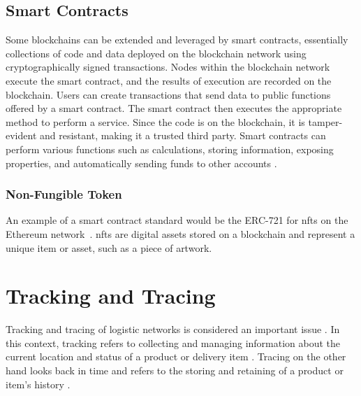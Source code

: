 \subsection{Smart Contracts}
Some blockchains can be extended and leveraged by smart contracts, essentially collections of code and data deployed on the blockchain network using cryptographically signed transactions. Nodes within the blockchain network execute the smart contract, and the results of execution are recorded on the blockchain. Users can create transactions that send data to public functions offered by a smart contract. The smart contract then executes the appropriate method to perform a service. Since the code is on the blockchain, it is tamper-evident and resistant, making it a trusted third party. Smart contracts can perform various functions such as calculations, storing information, exposing properties, and automatically sending funds to other accounts \parencite{blockchainoverview}.

\subsubsection{Non-Fungible Token}
An example of a smart contract standard would be the ERC-721 for \glspl{nft} on the Ethereum network~\cite{erc721}. \glspl{nft} are digital assets stored on a blockchain and represent a unique item or asset, such as a piece of artwork. 

\section{Tracking and Tracing}
Tracking and tracing of logistic networks is considered an important issue \cite{trackingtracing}. In this context, tracking refers to collecting and managing information about the current location and status of a product or delivery item \cite{trackingtracing}. Tracing on the other hand looks back in time and refers to the storing and retaining of a product or item's history \cite{practicetrackingtracing}.
